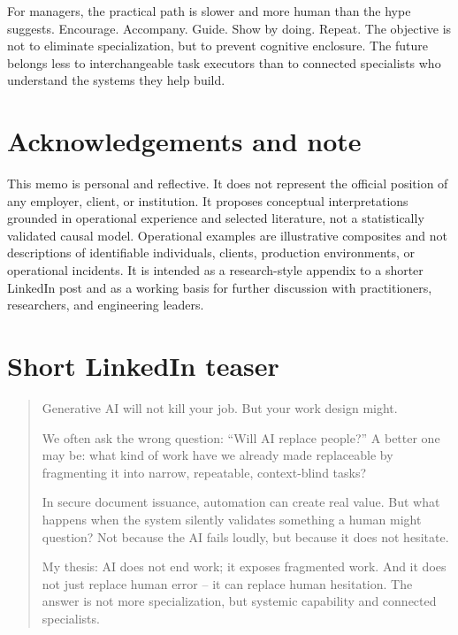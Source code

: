 \documentclass[11pt,a4paper]{article}
\begin{document}
For managers, the practical path is slower and more human than the hype suggests. Encourage. Accompany. Guide. Show by doing. Repeat. The objective is not to eliminate specialization, but to prevent cognitive enclosure. The future belongs less to interchangeable task executors than to connected specialists who understand the systems they help build.

\section*{Acknowledgements and note}
This memo is personal and reflective. It does not represent the official position of any employer, client, or institution. It proposes conceptual interpretations grounded in operational experience and selected literature, not a statistically validated causal model. Operational examples are illustrative composites and not descriptions of identifiable individuals, clients, production environments, or operational incidents. It is intended as a research-style appendix to a shorter LinkedIn post and as a working basis for further discussion with practitioners, researchers, and engineering leaders.

\printbibliography

\appendix
\section{Short LinkedIn teaser}
\begin{quote}
Generative AI will not kill your job. But your work design might.

We often ask the wrong question: ``Will AI replace people?'' A better one may be: what kind of work have we already made replaceable by fragmenting it into narrow, repeatable, context-blind tasks?

In secure document issuance, automation can create real value. But what happens when the system silently validates something a human might question? Not because the AI fails loudly, but because it does not hesitate.

My thesis: AI does not end work; it exposes fragmented work. And it does not just replace human error -- it can replace human hesitation. The answer is not more specialization, but systemic capability and connected specialists.
\end{quote}
\end{document}
